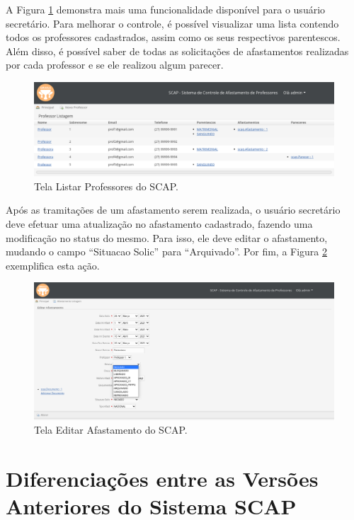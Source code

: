 A Figura \ref{fig-projeto-listar-professores} demonstra mais uma funcionalidade disponível para o usuário secretário. Para melhorar o controle, é possível visualizar uma lista contendo todos os professores cadastrados, assim como os seus respectivos parentescos. Além disso, é possível saber de todas as solicitações de afastamentos realizadas por cada professor e se ele realizou algum parecer.  

\begin{figure}[h]
	\centering
	\includegraphics[scale=0.33]{figuras/fig-projeto-listar-professores} 
	\caption{Tela Listar Professores do SCAP.}
	\label{fig-projeto-listar-professores}
\end{figure}

Após as tramitações de um afastamento serem realizada, o usuário secretário deve efetuar uma atualização no afastamento cadastrado, fazendo uma modificação no status do mesmo. Para isso, ele deve editar o afastamento, mudando o campo ``Situacao Solic'' para ``Arquivado''. Por fim, a Figura \ref{fig-projeto-editar-afastamento} exemplifica esta ação.

\begin{figure}[h]
	\centering
	\includegraphics[scale=0.33]{figuras/fig-projeto-editar-afastamento} 
	\caption{Tela Editar Afastamento do SCAP.}
	\label{fig-projeto-editar-afastamento}
\end{figure}

\section{Diferenciações entre as Versões Anteriores do Sistema SCAP}
\label{sec-projeto-diferenciacoes-versoes-anteriores}

